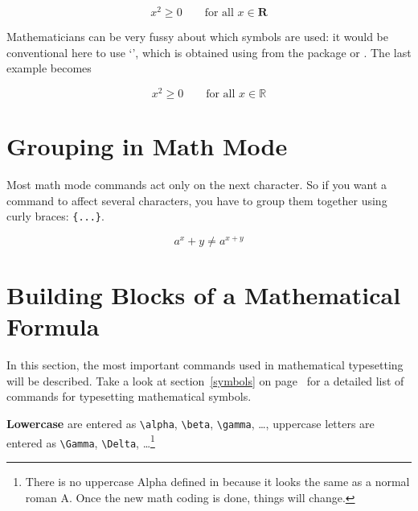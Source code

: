 \begin{example}
\begin{equation}
x^{2} \geq 0\qquad
\textrm{for all }x\in\mathbf{R}
\end{equation}
\end{example}
 

%
%
Mathematicians can be very fussy about which symbols are used:
it would be conventional here to use `',
 which is obtained using  from the
package  or .
\ifx\mathbb\undefined\else
The last example becomes
\begin{example}
\begin{displaymath}
x^{2} \geq 0\qquad
\textrm{for all }x\in\mathbb{R}
\end{displaymath}
\end{example}
\fi

\section{Grouping in Math Mode}

Most math mode commands act only on the next character. So if you
want a command to affect several characters, you have to group them
together using curly braces: \verb|{...}|.

\begin{example}
\begin{equation}
a^x+y \neq a^{x+y}
\end{equation}
\end{example}
 
\section{Building Blocks of a Mathematical Formula}

In this section, the most important commands used in mathematical
typesetting will be described. Take a look at section~\ref{symbols} on
page~\pageref{symbols} for a detailed list of commands for typesetting
mathematical symbols.

\textbf{Lowercase } are entered as \verb|\alpha|,
 \verb|\beta|, \verb|\gamma|, \ldots, uppercase letters
are entered as \verb|\Gamma|, \verb|\Delta|, \ldots\footnote{There is no
  uppercase Alpha defined in \LaTeXe{} because it looks the same as a
  normal roman A. Once the new math coding is done, things will
  change.} 

